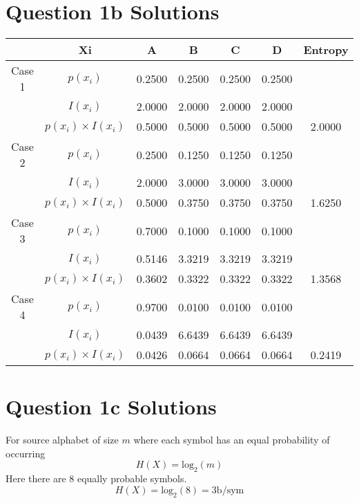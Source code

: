 \documentclass[a4paper,12pt]{article}
\begin{document}
\newpage
{}


\section*{Question 1b Solutions}

\begin{center}
\begin{tabular}{|c|c|c|c|c|c|c|}
\hline	&	Xi	&	A 	&	B	&	C	&	D	&	Entropy	\\ \hline \hline
Case 1	&	$p(x_i)$	&	0.2500	&	0.2500	&	0.2500	&	0.2500	&		\\ \hline
	&	$I(x_i)$	&	2.0000	&	2.0000	&	2.0000	&	2.0000	&		\\ \hline
	&	$p(x_i)\times I(x_i)$	&	0.5000	&	0.5000	&	0.5000	&	0.5000	&	2.0000	\\ \hline \hline
Case 2	&	$p(x_i)$	&	0.2500	&	0.1250	&	0.1250	&	0.1250	&		\\ \hline
	&	$I(x_i)$	&	2.0000	&	3.0000	&	3.0000	&	3.0000	&		\\ \hline
	&	$p(x_i)\times I(x_i)$	&	0.5000	&	0.3750	&	0.3750	&	0.3750	&	1.6250	\\ \hline \hline
Case 3	&	$p(x_i)$	&	0.7000	&	0.1000	&	0.1000	&	0.1000	&		\\ \hline
	&	$I(x_i)$	&	0.5146	&	3.3219	&	3.3219	&	3.3219	&		\\ \hline
	&	$p(x_i)\times I(x_i)$	&	0.3602	&	0.3322	&	0.3322	&	0.3322	&	1.3568	\\ \hline \hline
Case 4 	&	$p(x_i)$	&	0.9700	&	0.0100	&	0.0100	&	0.0100	&		\\ \hline
	&	$I(x_i)$	&	0.0439	&	6.6439	&	6.6439	&	6.6439	&		\\ \hline
	&	$p(x_i)\times I(x_i)$	&	0.0426	&	0.0664	&	0.0664	&	0.0664	&	0.2419	\\ \hline 

\end{tabular} 
\end{center}
\section*{Question 1c Solutions}

For source alphabet of size $m$ where each symbol has an equal probability of occurring
\[H(X) = \mbox{log}_2(m)\]
Here there are 8 equally probable symbols.
\[H(X) = \mbox{log}_2(8) = 3\mbox{b/sym}\]
\end{document}
